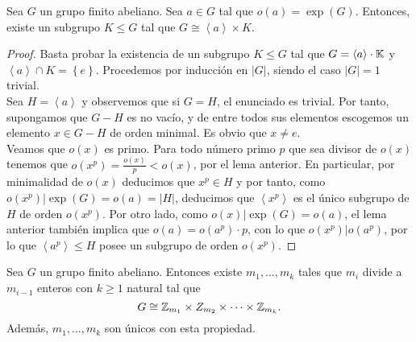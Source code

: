 \begin{lema}
Sea $\displaystyle G $ un grupo finito abeliano. Sea $\displaystyle a \in G $ tal que $\displaystyle o\left(a\right) = \exp\left(G\right) $. Entonces, existe un subgrupo $\displaystyle K \leq G $ tal que $\displaystyle G \cong \left\langle a \right\rangle \times K $. 
\end{lema}
\begin{proof}
	Basta probar la existencia de un subgrupo $\displaystyle K \leq G $ tal que $\displaystyle G = \left\langle a \right\rangle \cdot \mathbb{K} $ y $\displaystyle \left\langle a \right\rangle \cap K = \left\{ e\right\}  $. Procedemos por inducción en $\displaystyle \left|G\right| $, siendo el caso $\displaystyle \left|G\right| = 1 $ trivial. \\
Sea $\displaystyle H = \left\langle a \right\rangle  $ y observemos que si $\displaystyle G = H $, el enunciado es trivial. Por tanto, supongamos que $\displaystyle G-H $ es no vacío, y de entre todos sus elementos escogemos un elemento $\displaystyle x \in G - H $ de orden minimal. Es obvio que $\displaystyle x \neq e $. \\
Veamos que $\displaystyle o\left(x\right) $ es primo. Para todo número primo $\displaystyle p $ que sea divisor de $\displaystyle o\left(x\right) $ tenemos que $\displaystyle o\left(x^{p}\right) = \frac{o\left(x\right)}{p} < o\left(x\right) $, por el lema anterior. En particular, por minimalidad de $\displaystyle o\left(x\right) $ deducimos que $\displaystyle x^{p} \in H $ y por tanto, como $\displaystyle o\left(x^{p}\right) | \exp\left(G\right) = o\left(a\right) = \left|H\right| $, deducimos que $\displaystyle \left\langle x^{p} \right\rangle  $ es el único subgrupo de $\displaystyle H $ de orden $\displaystyle o\left(x^{p}\right) $.
Por otro lado, como $\displaystyle o\left(x\right) | \exp\left(G\right) = o\left(a\right) $, el lema anterior también implica que $\displaystyle o\left(a\right) = o\left(a^{p}\right) \cdot p $, con lo que $\displaystyle o\left(x^{p}\right) | o\left(a^{p}\right) $, por lo que $\displaystyle \left\langle a^{p} \right\rangle \leq H $ posee un subgrupo de orden $\displaystyle o\left(x^{p}\right) $. 
\end{proof}
\begin{theorem}
Sea $\displaystyle G $ un grupo finito abeliano. Entonces existe $\displaystyle m_{1}, \ldots, m_{k} $ tales que $\displaystyle m_{i} $ divide a $\displaystyle m_{i-1} $ enteros con $\displaystyle k \geq 1 $ natural tal que 
\[ G \cong \mathbb{Z}_{m_{1}} \times Z_{m_{2}} \times \cdots \times \mathbb{Z}_{m_{k}} .\]
Además, $\displaystyle m_{1}, \ldots, m_{k} $ son únicos con esta propiedad. 
\end{theorem}
